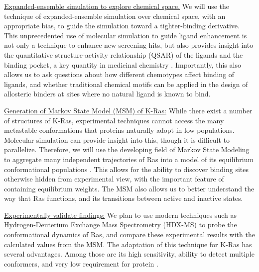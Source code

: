 \documentclass[12pt]{article}
\begin{document}
\underline{Expanded-ensemble simulation to explore chemical space.} We will use the technique of expanded-ensemble simulation \cite{lyubartsev1992} over chemical space, with an appropriate bias, to guide the simulation toward a tighter-binding derivative. This unprecedented use of molecular simulation to guide ligand enhancement is not only a technique to enhance new screening hits, but also provides insight into the quantitative structure-activity relationship (QSAR) of the ligands and the binding pocket, a key quantity in medicinal chemistry \cite{qsar}. Importantly, this also allows us to ask questions about how different chemotypes affect binding of ligands, and whether traditional chemical motifs can be applied in the design of allosteric binders at sites where no natural ligand is known to bind.

\underline{Generation of Markov State Model (MSM) of K-Ras:} While there exist a number of structures of K-Ras, experimental techniques cannot access the many metastable conformations that proteins naturally adopt in low populations. Molecular simulation can provide insight into this, though it is difficult to parallelize. Therefore, we will use the developing field of Markov State Modeling to aggregate many independent trajectories of Ras into a model of its equilibrium conformational populations \cite{chodera2014}. This allows for the ability to discover binding sites otherwise hidden from experimental view, with the important feature of containing equilibrium weights. The MSM also allows us to better understand the way that Ras functions, and its transitions between active and inactive states. 

\underline{Experimentally validate findings:} We plan to use modern techniques such as Hydrogen-Deuterium Exchange Mass Spectrometry (HDX-MS) \cite{hdxms} to probe the conformational dynamics of Ras, and compare these experimental results with the calculated values from the MSM. The adaptation of this technique for K-Ras has several advantages. Among those are its high sensitivity, ability to detect multiple conformers, and very low requirement for protein \cite{hdxms}. 
\end{document}
